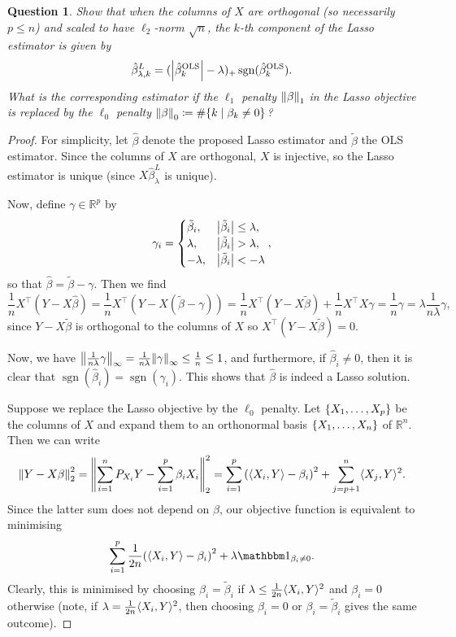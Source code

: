 \documentclass{article}
\theoremstyle{plain}
\newtheorem{question}{Question}
\theoremstyle{remark}
\newcommand{\Bb}{\mathbb}
\newcommand{\Rm}{\mathrm}
\newcommand{\RR}{\Bb R}
\DeclarePairedDelimiter{\ang}{\langle}{\rangle}
\newcommand{\T}{^\top} %
\newcommand\ceq\coloneqq %
\newcommand\ind{\mathbbm 1} %
\DeclareMathOperator{\sign}{sgn}
\begin{document}
\begin{question}
	Show that when the columns of $X$ are orthogonal (so necessarily $p \leq n$) and scaled to have $\ell_2$-norm $\sqrt n$, the $k$-th component of the Lasso estimator is given by
	\[
	\hat\beta^L_{\lambda, k} = (\abs{\hat\beta_k^\Rm{OLS}} - \lambda)_+ \sign(\hat\beta_k^\Rm{OLS}). 
	\]
	What is the corresponding estimator if the $\ell_1$ penalty $\norm{\beta}_1$ in the Lasso objective is replaced by the $\ell_0$ penalty $\norm{\beta}_0 \ceq \#\qty{k \mid \beta_k \neq 0}$? 
\end{question}

\begin{proof}
	For simplicity, let $\hat\beta$ denote the proposed Lasso estimator and $\tilde\beta$ the OLS estimator. Since the columns of $X$ are orthogonal, $X$ is injective, so the Lasso estimator is unique (since $X\hat\beta_\lambda^L$ is unique). 
	
	Now, define $\gamma \in \RR^p$ by 
	\[
	\gamma_i = \begin{cases}
		\tilde\beta_i, &\abs{\tilde\beta_i}\leq \lambda, \\ \lambda, &\abs{\tilde\beta_i} > \lambda, \\ -\lambda, &\abs{\tilde\beta_i} < -\lambda
	\end{cases},
	\]
	so that $\hat\beta= \tilde\beta - \gamma$. Then we find
	\[
	\frac1n X\T (Y- X\hat\beta) = \frac1n X\T(Y - X(\tilde\beta - \gamma)) = \frac1n X\T (Y - X\tilde\beta)+ \frac1n X\T X\gamma = \frac1n \gamma = \lambda \frac1{n\lambda}\gamma, 
	\]
	since $Y - X\tilde\beta$ is orthogonal to the columns of $X$ so $X\T(Y - X\tilde\beta) = 0$. 
	
	Now, we have $\norm{\frac1{n\lambda} \gamma}_\infty = \frac1{n\lambda} \norm{\gamma}_\infty \leq \frac1n \leq 1$, and furthermore, if $\hat\beta_i \neq 0$, then it is clear that $\sign(\hat\beta_i) = \sign(\gamma_i)$. This shows that $\hat\beta$ is indeed a Lasso solution. 
	
	Suppose we replace the Lasso objective by the $\ell_0$ penalty. Let $\qty{X_1, \dotsc, X_p}$ be the columns of $X$ and expand them to an orthonormal basis $\qty{X_1, \dotsc, X_n}$ of $\RR^n$. Then we can write
	\[
	\norm{Y - X\beta}_2^2 = \norm{\sum_{i=1}^n P_{X_i} Y - \sum_{i=1}^p \beta_i X_i}_2^2 = \sum_{i=1}^p \qty(\ang{X_i, Y} - \beta_i)^2  + \sum_{j = p+1}^n \ang{X_{j}, Y}^2. 
	\]
	Since the latter sum does not depend on $\beta$, our objective function is equivalent to minimising
	\[
	\sum_{i=1}^p \frac1{2n}\qty(\ang{X_i, Y} - \beta_i)^2 + \lambda \ind_{\beta_i \neq 0}. 
	\]
	Clearly, this is minimised by choosing $\beta_i = \tilde\beta_i$ if $\lambda \leq \frac1{2n} \ang{X_i, Y}^2$ and $\beta_i = 0$ otherwise (note, if $\lambda = \frac1{2n} \ang{X_i, Y}^2$, then choosing $\beta_i =0 $ or $\beta_i = \tilde\beta_i$ gives the same outcome). 
	\end{proof}
\end{document}
